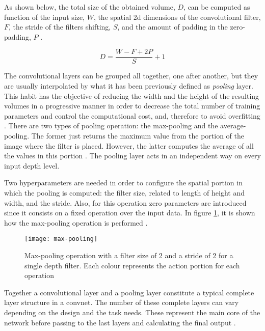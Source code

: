 	As shown below, the total size of the obtained volume, $D$, can be computed as function of the input size, $W$, the spatial 2\acrshort{d} dimensions of the convolutional filter, $F$, the stride of the filters shifting, $S$,  and the amount of padding in the zero-padding, $P$ \cite{Karpathy2016}. 
	
	\[ D = \frac{W - F + 2P}{S} + 1 \]
	
	The convolutional layers can be grouped all together, one after another, but they are usually interpolated by what it has been previously defined as \textit{pooling} layer. This habit has the objective of reducing the width and the height of the resulting volumes in a progressive manner in order to decrease the total number of training parameters and control the computational cost, and, therefore to avoid overfitting \cite{Karpathy2016}. There are two types of pooling operation: the max-pooling and the average-pooling. The former just returns the maximum value from the portion of the image where the filter is placed. However, the latter computes the average of all the values in this portion \cite{Saha2018}. The pooling layer acts in an independent way on every input depth level. 
	
	Two hyperparameters are needed in order to configure the spatial portion in which the pooling is computed: the  filter size, related to length of height and width, and the stride. Also, for this operation zero parameters are introduced since it consists on a fixed operation over the input data. In figure \ref{fig:mesh12}, it is shown how the max-pooling operation is performed \cite{Karpathy2016}. 
	
	\begin{figure}[ht]
		\centering
		\captionsetup{justification=centering}
		\texttt{[image: max-pooling]}
		\caption{Max-pooling operation with a filter size of 2 and a stride of 2 for a single depth filter. Each colour represents the action portion for each operation \cite{Karpathy2016}}
		\label{fig:mesh12}
	\end{figure}
	
	Together a convolutional layer and a pooling layer constitute a typical complete layer structure in a \acrlong{convnet}. The number of these complete layers can vary depending on the design and the task needs. These represent the main core of the network before passing to the last layers and calculating the final output \cite{Saha2018}.
	
